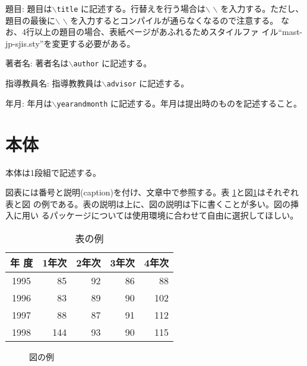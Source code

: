 \documentclass[a4paper,11pt]{jreport}
\begin{document}
\begin{description} \parskip=1pt
\item{題目: }
題目は{\tt $\backslash$title} に記述する。行替えを行う場合は$\backslash$
	   $\backslash$ を入力する。ただし、題目の最後に$\backslash$
	   $\backslash$ を入力するとコンパイルが通らなくなるので注意する。
	   なお、4行以上の題目の場合、表紙ページがあふれるためスタイルファ
	   イル``mast-jp-sjis.sty''を変更する必要がある。
\item{著者名: }
著者名は{\tt $\backslash$author} に記述する。
\item{指導教員名: }
指導教教員は{\tt $\backslash$advisor} に記述する。
\item{年月: }
年月は{\tt $\backslash$yearandmonth} に記述する。年月は提出時のものを記述すること。
\end{description}

\section{本体}

本体は1段組で記述する。

図表には番号と説明(caption)を付け、文章中で参照する。表
\ref{table:fundamental_data_type}と図\ref{figure:sample}はそれぞれ表と図
の例である。表の説明は上に、図の説明は下に書くことが多い。図の挿入に用い
るパッケージについては使用環境に合わせて自由に選択してほしい。

\begin{table}[hbt]
\caption{表の例}
\label{table:fundamental_data_type}
\begin{center}
\begin{tabular}{| c | r | r | r | r |}
\hline
年 度 & 1年次 & 2年次 & 3年次 & 4年次 \\
\hline
1995 & 85 & 92 & 86 & 88 \\
1996 & 83 & 89 & 90 & 102 \\
1997 & 88 & 87 & 91 & 112 \\
1998 & 144 & 93 & 90 & 115 \\
\hline 
\end{tabular}
\end{center}
\end{table}
\medskip

\begin{figure}[htbp]
\begin{center}
\end{center}
\caption{図の例}
\label{figure:sample}
\end{figure}
\end{document}
